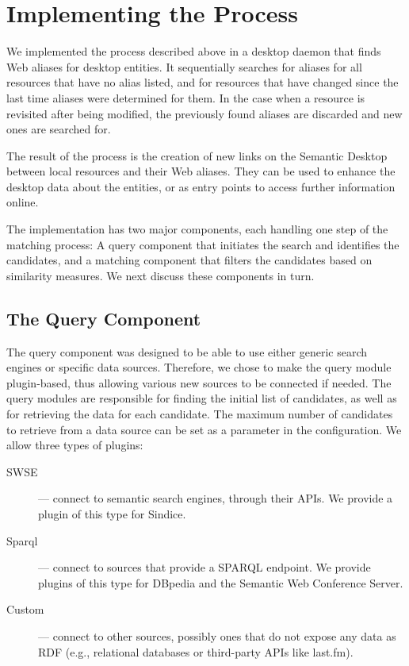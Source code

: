 \section{Implementing the Process}

We implemented the process described above in a desktop daemon that finds Web aliases for desktop entities.
It sequentially searches for aliases for all resources that have no alias listed, and for resources that have changed since the last time aliases were determined for them. In the case when a resource is revisited after being modified, the previously found aliases are discarded and new ones are searched for.

The result of the process is the creation of new links on the Semantic Desktop between local resources and their Web aliases. They can be used to enhance the desktop data about the entities, or as entry points to access further information online.

The implementation has two major components, each handling one step of the matching process: A query component that initiates the search and identifies the candidates, and a matching component that filters the candidates based on similarity measures. We next discuss these components in turn.

\subsection{The Query Component}
\label{sub:querymodule}

The query component was designed to be able to use either generic search engines or specific data sources. Therefore, we chose to make the query module plugin-based, thus allowing various new sources to be connected if needed. The query modules are responsible for finding the initial list of candidates, as well as for retrieving the data for each candidate. The maximum number of candidates to retrieve from a data source can be set as a parameter in the configuration. We allow three types of plugins:
\begin{description}
 \item[SWSE] --- connect to semantic search engines, through their APIs. We provide a plugin of this type for Sindice.
 \item[Sparql] --- connect to sources that provide a SPARQL endpoint. We provide plugins of this type for DBpedia and the Semantic Web Conference Server.
 \item[Custom] --- connect to other sources, possibly ones that do not expose any data as RDF (e.g., relational databases or third-party APIs like last.fm).
 \end{description}

